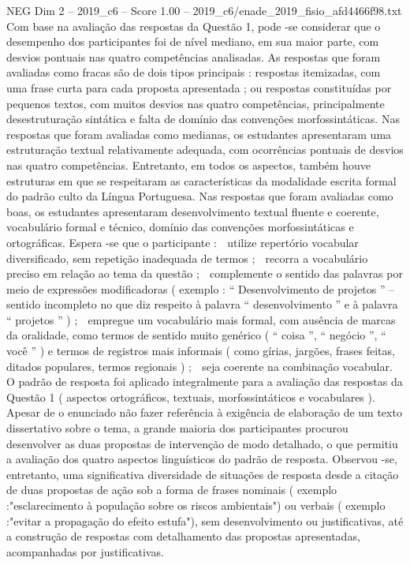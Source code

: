\begin{textsample}{NEG Dim 2 – 2019\_c6 – Score 1.00 – 2019\_c6/enade\_2019\_fisio\_afd4466f98.txt}
Com base na avaliação das respostas da Questão 1, pode -se considerar que o desempenho dos participantes foi de nível mediano, em sua maior parte, com desvios pontuais nas quatro competências analisadas.
As respostas que foram avaliadas como fracas são de dois tipos principais : respostas itemizadas, com uma frase curta para cada proposta apresentada ; ou respostas constituídas por pequenos textos, com muitos desvios nas quatro competências, principalmente desestruturação sintática e falta de domínio das convenções morfossintáticas.
Nas respostas que foram avaliadas como medianas, os estudantes apresentaram uma estruturação textual relativamente adequada, com ocorrências pontuais de desvios nas quatro competências.
Entretanto, em todos os aspectos, também houve estruturas em que se respeitaram as características da modalidade escrita formal do padrão culto da Língua Portuguesa.
Nas respostas que foram avaliadas como boas, os estudantes apresentaram desenvolvimento textual fluente e coerente, vocabulário formal e técnico, domínio das convenções morfossintáticas e ortográficas.
Espera -se que o participante :  utilize repertório vocabular diversificado, sem repetição inadequada de termos ;  recorra a vocabulário preciso em relação ao tema da questão ;  complemente o sentido das palavras por meio de expressões modificadoras ( exemplo : “ Desenvolvimento de projetos ” – sentido incompleto no que diz respeito à palavra “ desenvolvimento ” e à palavra “ projetos ” ) ;  empregue um vocabulário mais formal, com ausência de marcas da oralidade, como termos de sentido muito genérico ( “ coisa ”, “ negócio ”, “ você ” ) e termos de registros mais informais ( como gírias, jargões, frases feitas, ditados populares, termos regionais ) ;  seja coerente na combinação vocabular.
O padrão de resposta foi aplicado integralmente para a avaliação das respostas da Questão 1 ( aspectos ortográficos, textuais, morfossintáticos e vocabulares ).
Apesar de o enunciado não fazer referência à exigência de elaboração de um texto dissertativo sobre o tema, a grande maioria dos participantes procurou desenvolver as duas propostas de intervenção de modo detalhado, o que permitiu a avaliação dos quatro aspectos linguísticos do padrão de resposta.
Observou -se, entretanto, uma significativa diversidade de situações de resposta desde a citação de duas propostas de ação sob a forma de frases nominais ( exemplo :"esclarecimento à população sobre os riscos ambientais") ou verbais ( exemplo :"evitar a propagação do efeito estufa"), sem desenvolvimento ou justificativas, até a construção de respostas com detalhamento das propostas apresentadas, acompanhadas por justificativas.

\end{textsample}
